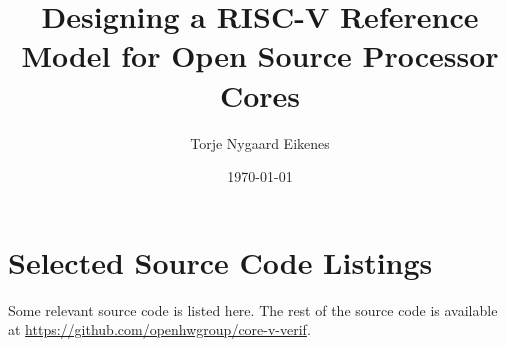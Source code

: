 \documentclass[british]{ntnuthesis}
\title{Designing a RISC-V Reference Model for Open Source Processor Cores}
\author{Torje Nygaard Eikenes}
\date{\today}
\begin{document}





\tableofcontents
\listoffigures

\printglossary[type=\acronymtype,nonumberlist] %
\printglossary                    %























%
%
%
%
%
%


\chapter*{\bibname}
\printbibliography[heading=none]

%

\appendix
\chapter{Selected Source Code Listings}
Some relevant source code is listed here. The rest of the source code is available at \url{https://github.com/openhwgroup/core-v-verif}.





%

%
%
%
\end{document}
